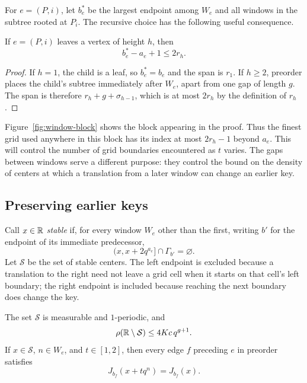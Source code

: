 For $e=(P,i)$, let $b_e^*$ be the largest endpoint among $W_e$ and all
windows in the subtree rooted at $P_i$.  The recursive choice has the
following useful consequence.

\begin{lemma}\label{lem:window-span}
If $e=(P,i)$ leaves a vertex of height $h$, then
\begin{equation}\label{eq:window-span}
 b_e^*-a_e+1\le2r_h.
\end{equation}
\end{lemma}

\begin{proof}
If $h=1$, the child is a leaf, so $b_e^*=b_e$ and the span is $r_1$.
If $h\ge2$, preorder places the child's subtree immediately after
$W_e$, apart from one gap of length $g$.  The span is therefore
$r_h+g+\sigma_{h-1}$, which is at most $2r_h$ by the definition of
$r_h$.
\end{proof}

Figure~\ref{fig:window-block} shows the block appearing in the proof.
Thus the finest grid used anywhere in this block has its index at most
$2r_h-1$ beyond $a_e$.  This will control the number of grid boundaries
encountered as $t$ varies.  The gaps between windows serve a different
purpose: they control the bound on the density of centers at which a
translation from a later window can change an earlier key.



\subsection*{Preserving earlier keys}

Call $x\in\mathbb R$ \emph{stable} if, for every window $W_e$ other than the
first, writing $b'$ for the endpoint of its immediate predecessor,
\[
 (x,x+2q^{a_e}]\cap\Gamma_{b'}=\varnothing.
\]
Let $\mathcal S$ be the set of stable centers.  The left endpoint is
excluded because a translation to the right need not leave a grid cell
when it starts on that cell's left boundary; the right endpoint is
included because reaching the next boundary does change the key.

\begin{lemma}\label{lem:stability}
The set $\mathcal S$ is measurable and $1$-periodic, and
\[
 \rho(\mathbb R\setminus\mathcal S)\le4Kc\,q^{g+1}.
\]
If $x\in\mathcal S$, $n\in W_e$, and $t\in[1,2]$, then every edge $f$
preceding $e$ in preorder satisfies
\begin{equation}\label{eq:stable-keys}
 J_{b_f}(x+tq^n)=J_{b_f}(x).
\end{equation}
\end{lemma}

